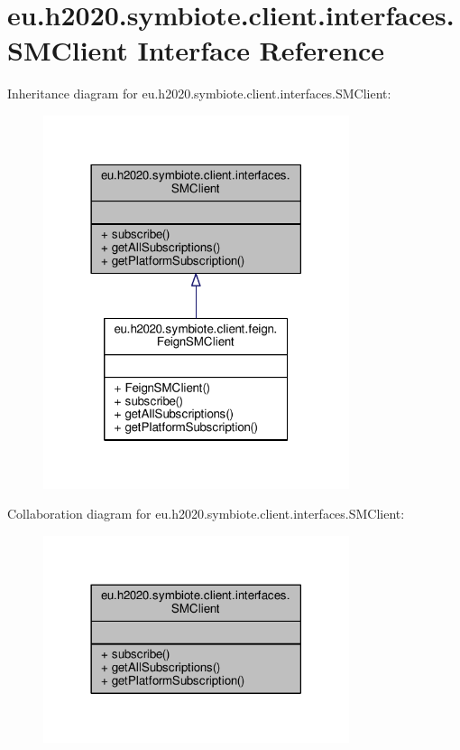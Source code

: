 \hypertarget{interfaceeu_1_1h2020_1_1symbiote_1_1client_1_1interfaces_1_1SMClient}{}\section{eu.\+h2020.\+symbiote.\+client.\+interfaces.\+S\+M\+Client Interface Reference}
\label{interfaceeu_1_1h2020_1_1symbiote_1_1client_1_1interfaces_1_1SMClient}


Inheritance diagram for eu.\+h2020.\+symbiote.\+client.\+interfaces.\+S\+M\+Client\+:\nopagebreak
\begin{figure}[H]
\begin{center}
\leavevmode
\includegraphics[width=254pt]{interfaceeu_1_1h2020_1_1symbiote_1_1client_1_1interfaces_1_1SMClient__inherit__graph}
\end{center}
\end{figure}


Collaboration diagram for eu.\+h2020.\+symbiote.\+client.\+interfaces.\+S\+M\+Client\+:\nopagebreak
\begin{figure}[H]
\begin{center}
\leavevmode
\includegraphics[width=254pt]{interfaceeu_1_1h2020_1_1symbiote_1_1client_1_1interfaces_1_1SMClient__coll__graph}
\end{center}
\end{figure}
